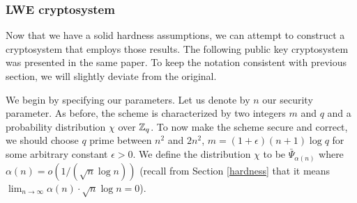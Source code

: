 

\subsubsection{LWE cryptosystem}
Now that we have a solid hardness assumptions, we can attempt to construct a cryptosystem that employs those results. The following public key cryptosystem was presented in the same paper. To keep the notation consistent with previous section, we will slightly deviate from the original.

We begin by specifying our parameters. Let us denote by $n$ our security parameter. As before, the scheme is characterized by two integers $m$ and $q$ and a probability distribution $\chi$ over $\mathbb{Z}_q$. To now make the scheme secure and correct, we should choose $q$ prime between $n^2$ and $2n^2$, $m = (1 + \epsilon)(n + 1) \log q$ for some arbitrary constant $\epsilon > 0$. We define the distribution $\chi$ to be $\bar{\Psi}_{\alpha (n)}$ where $\alpha (n) = o(1/(\sqrt{n} \log n))$ (recall from Section \ref{hardness} that it means $\lim_{n\to\infty} \alpha (n) \cdot \sqrt{n} \log n = 0$).\\

